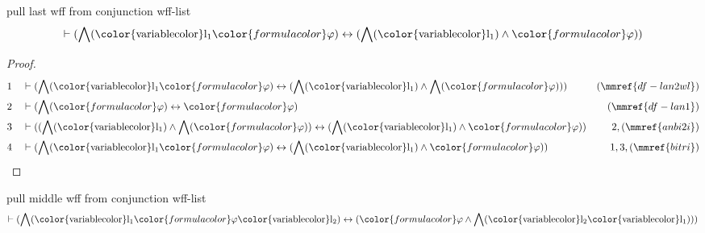 \begin{lemma} pull last wff from conjunction wff-list
\begin{align}
\vdash ( \bigwedge( {\rm\color{variablecolor}l_1} {\color{formulacolor}\varphi}
    ) \leftrightarrow ( \bigwedge( {\rm\color{variablecolor}l_1} ) \wedge
    {\color{formulacolor}\varphi} ) )\label{bl.anplw}
\end{align}
\end{lemma}

\begin{proof}
\begin{align}
  1 && & \vdash ( \bigwedge( {\rm\color{variablecolor}l_1}
      {\color{formulacolor}\varphi} ) \leftrightarrow (
      \bigwedge( {\rm\color{variablecolor}l_1} ) \wedge
      \bigwedge( {\color{formulacolor}\varphi} ) )
      )&(\mmref{df-lan2wl})\notag
  \\ 2 && & \vdash ( \bigwedge( {\color{formulacolor}\varphi} ) \leftrightarrow
      {\color{formulacolor}\varphi}
      )&(\mmref{df-lan1})\notag
  \\ 3 && & \vdash ( ( \bigwedge( {\rm\color{variablecolor}l_1} ) \wedge
      \bigwedge( {\color{formulacolor}\varphi} ) )
      \leftrightarrow ( \bigwedge(
      {\rm\color{variablecolor}l_1} ) \wedge
      {\color{formulacolor}\varphi} )
      )&2,(\mmref{anbi2i})\notag
  \\ 4 && & \vdash ( \bigwedge( {\rm\color{variablecolor}l_1}
      {\color{formulacolor}\varphi} ) \leftrightarrow (
      \bigwedge( {\rm\color{variablecolor}l_1} ) \wedge
      {\color{formulacolor}\varphi} )
      )&1,3,(\mmref{bitri})\notag
\end{align}
\end{proof}

\begin{lemma} pull middle wff from conjunction wff-list
\begin{align}
\vdash ( \bigwedge( {\rm\color{variablecolor}l_1} {\color{formulacolor}\varphi}
    {\rm\color{variablecolor}l_2} ) \leftrightarrow (
    {\color{formulacolor}\varphi} \wedge \bigwedge(
    {\rm\color{variablecolor}l_2} {\rm\color{variablecolor}l_1} ) )
    )\label{bl.anpmw}
\end{align}
\end{lemma}

